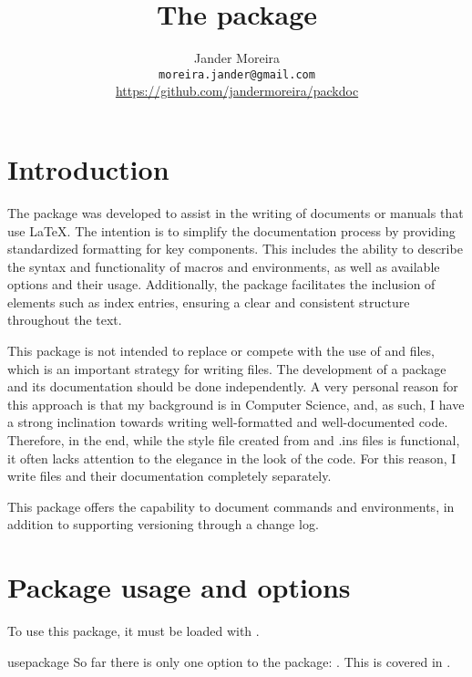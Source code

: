 \documentclass[11pt]{article}
\title{The \PackageName{packdoc} package\\\normalsize\textsf{\PDVersion}}
\author{%
    Jander Moreira\\%
    \texttt{moreira.jander@gmail.com}\\%
    \url{https://github.com/jandermoreira/packdoc}%
}
\date{\PDDate}
\begin{document}
\maketitle
\tableofcontents

\PDPrintChanges


\section{Introduction}

The  package was developed to assist in the writing of documents or manuals that use \LaTeX. The intention is to simplify the documentation process by providing standardized formatting for key components. This includes the ability to describe the syntax and functionality of macros and environments, as well as available options and their usage. Additionally, the package facilitates the inclusion of elements such as index entries, ensuring a clear and consistent structure throughout the text.

This package is not intended to replace or compete with the use of  and  files, which is an important strategy for writing  files. The development of a package and its documentation should be done independently. A very personal reason for this approach is that my background is in Computer Science, and, as such, I have a strong inclination towards writing well-formatted and well-documented code. Therefore, in the end, while the style file created from  and .ins files is functional, it often lacks attention to the elegance in the look of the code. For this reason, I write  files and their documentation completely separately.

This package offers the capability to document commands and environments, in addition to supporting versioning through a change log.

\section{Package usage and options}
To use this package, it must be loaded with .

\begin{Macro*}{usepackage}{}{}
    So far there is only one option to the package: . This is covered in .
\end{Macro*}
\end{document}

